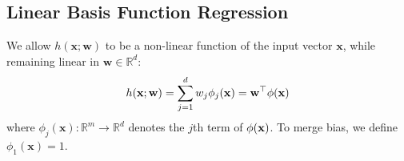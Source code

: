 \documentclass[11pt,letterpaper]{article}
\begin{document}
\subsection{Linear Basis Function Regression}
We allow $h(\mathbf{x};\mathbf{w})$ to be a non-linear function of the input vector $\mathbf{x}$, while remaining linear in $\mathbf{w} \in \mathbb{R}^d$:
\begin{align}
    h(\mathbf{x};\mathbf{w})= \sum_{j=1}^{d}w_j\phi_j(\mathbf{x})
    =\mathbf{w}^\top\mathbf{\mathbf{\phi}}(\mathbf{x})
\end{align}
where $\phi_j(\mathbf{x}) : \mathbb{R}^m \rightarrow \mathbb{R}^d$ denotes the $j$th term of $\mathbf{\phi}(\mathbf{x})$. To merge bias, we define $\phi_1(\mathbf{x})=1$.

\newpage
\end{document}
